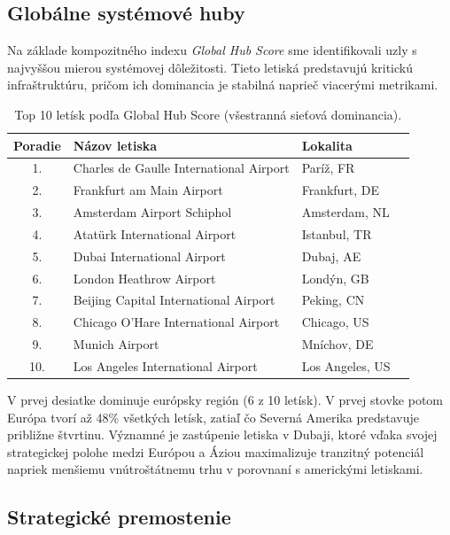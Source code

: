 \subsection{Globálne systémové huby}

Na základe kompozitného indexu \textit{Global Hub Score} sme identifikovali uzly s najvyššou mierou systémovej dôležitosti. Tieto letiská predstavujú 
kritickú infraštruktúru, pričom ich dominancia je stabilná naprieč viacerými metrikami.

\begin{table}[h!]
\centering
\small
\begin{tabular}{cllc}
\hline
\textbf{Poradie} & \textbf{Názov letiska} & \textbf{Lokalita} \\ \hline
1. & Charles de Gaulle International Airport & Paríž, FR \\
2. & Frankfurt am Main Airport & Frankfurt, DE \\
3. & Amsterdam Airport Schiphol & Amsterdam, NL \\
4. & Atatürk International Airport & Istanbul, TR \\
5. & Dubai International Airport & Dubaj, AE \\
6. & London Heathrow Airport & Londýn, GB \\
7. & Beijing Capital International Airport & Peking, CN \\
8. & Chicago O'Hare International Airport & Chicago, US \\
9. & Munich Airport & Mníchov, DE \\
10. & Los Angeles International Airport & Los Angeles, US \\ \hline
\end{tabular}
\caption{\centering Top 10 letísk podľa Global Hub Score (všestranná sieťová dominancia).}
\label{tab:top10_global_hubs}
\end{table}

V prvej desiatke dominuje európsky región (6 z 10 letísk). V prvej stovke potom Európa tvorí až 48\% všetkých letísk, zatiaľ čo 
Severná Amerika predstavuje približne štvrtinu. Významné je zastúpenie letiska v Dubaji, ktoré vďaka svojej strategickej polohe 
medzi Európou a Áziou maximalizuje tranzitný potenciál napriek menšiemu vnútroštátnemu trhu v porovnaní s americkými letiskami.


\subsection{Strategické premostenie}

